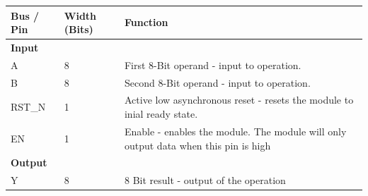 \documentclass[12pt,letterpaper]{article}
\begin{document}
\begin{table}[h!]
    \setlength{\extrarowheight}{4pt}
    \centering
    \begin{tabular}{lll}
    \hline
    \multicolumn{1}{|l|}{\textbf{Bus / Pin}} & \multicolumn{1}{l|}{\textbf{Width (Bits)}} & \multicolumn{1}{p{10cm}|}{\textbf{Function}}                                                                                                                    \\ \hline
    \textbf{Input}                           &                                            &                                                                                                                                                                 \\ \hline
    \multicolumn{1}{|l|}{A}                  & \multicolumn{1}{l|}{8}                     & \multicolumn{1}{p{10cm}|}{First 8-Bit operand - input to operation.}                                                                                            \\ \hline
    \multicolumn{1}{|l|}{B}                  & \multicolumn{1}{l|}{8}                     & \multicolumn{1}{p{10cm}|}{Second 8-Bit operand - input to operation.}                                                                                           \\ \hline
    \multicolumn{1}{|l|}{RST\_N}             & \multicolumn{1}{l|}{1}                     & \multicolumn{1}{p{10cm}|}{Active low asynchronous reset - resets the module to inial ready state.}                                                              \\ \hline
    \multicolumn{1}{|l|}{EN}                 & \multicolumn{1}{l|}{1}                     & \multicolumn{1}{p{10cm}|}{Enable - enables the module. The module will only output data when this pin is high}                                                  \\ \hline
    \textbf{Output}                          &                                            &                                                                                                                                                                 \\ \hline
    \multicolumn{1}{|l|}{Y}                  & \multicolumn{1}{l|}{8}                     & \multicolumn{1}{p{10cm}|}{8 Bit result - output of the operation}                                                                                               \\ \hline

\end{tabular}
\end{table}
\end{document}
